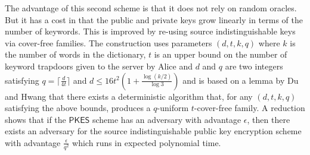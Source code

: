 \documentclass[a4paper,11pt]{article}
\begin{document}
    The advantage of this second scheme is that it does not rely on random oracles. But it has a cost in that the public and private keys grow linearly in terms of the number of keywords. This is improved by re-using source indistinguishable keys via cover-free families. The construction uses parameters $(d, t, k, q)$ where $k$ is the number of words in the dictionary, $t$ is an upper bound on the number of keyword trapdoors given to the server by Alice and $d$ and $q$ are two integers satisfying $q = \lceil \frac{d}{4t} \rceil$ and $d \leq 16t^2(1 + \frac{\log(k/2)}{\log 3})$ and is based on a lemma by Du and Hwang that there exists a deterministic algorithm that, for any $(d, t, k, q)$ satisfying the above bounds, produces a $q$-uniform $t$-cover-free family. A reduction shows that if the $\mathsf{PKES}$ scheme has an adversary with advantage $\epsilon$, then there exists an adversary for the source indistinguishable public key encryption scheme with advantage $\frac{\epsilon}{q^2}$ which runs in expected polynomial time.
\end{document}
